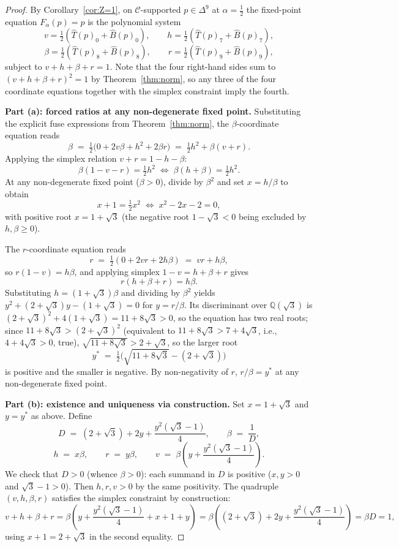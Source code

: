 \documentclass[11pt,reqno]{amsart}
\theoremstyle{plain}
\theoremstyle{definition}
\theoremstyle{remark}
\newcommand{\Q}{\mathbb{Q}}
\newcommand{\Cfour}{\mathcal{C}}
\newcommand{\Tfuse}{\widehat{T}}
\newcommand{\Bfuse}{\widehat{B}}
\newcommand{\Fmix}{F_{\alpha}}
\newcommand{\Simp}{\Delta^{9}}
\begin{document}
\begin{proof}
By Corollary~\ref{cor:Z=1}, on $\Cfour$-supported $p\in\Simp$ at
$\alpha=\tfrac12$ the fixed-point equation $\Fmix(p)=p$ is the
polynomial system
\[
v=\tfrac12(\Tfuse(p)_{0}+\Bfuse(p)_{0}),\qquad
h=\tfrac12(\Tfuse(p)_{7}+\Bfuse(p)_{7}),
\]
\[
\beta=\tfrac12(\Tfuse(p)_{8}+\Bfuse(p)_{8}),\qquad
r=\tfrac12(\Tfuse(p)_{9}+\Bfuse(p)_{9}),
\]
subject to $v+h+\beta+r=1$. Note that the four right-hand sides
sum to $(v+h+\beta+r)^{2}=1$ by Theorem~\ref{thm:norm}, so any
three of the four coordinate equations together with the simplex
constraint imply the fourth.

\textbf{Part (a): forced ratios at any non-degenerate fixed point.}
Substituting the explicit fuse expressions from
Theorem~\ref{thm:norm}, the $\beta$-coordinate equation reads
\[
\beta\;=\;\tfrac12\bigl(0+2v\beta+h^{2}+2\beta r\bigr)\;=\;\tfrac{1}{2}h^{2}+\beta(v+r).
\]
Applying the simplex relation $v+r=1-h-\beta$:
\[
\beta(1-v-r)=\tfrac{1}{2}h^{2}\;\Longleftrightarrow\;\beta(h+\beta)=\tfrac{1}{2}h^{2}.
\]
At any non-degenerate fixed point ($\beta>0$), divide by
$\beta^{2}$ and set $x=h/\beta$ to obtain
\[
x+1=\tfrac{1}{2}x^{2}\;\Longleftrightarrow\;x^{2}-2x-2=0,
\]
with positive root $x=1+\sqrt{3}$ (the negative root
$1-\sqrt{3}<0$ being excluded by $h,\beta\geq 0$).

The $r$-coordinate equation reads
\[
r\;=\;\tfrac12(0+2vr+2h\beta)\;=\;vr+h\beta,
\]
so $r(1-v)=h\beta$, and applying simplex $1-v=h+\beta+r$ gives
\begin{equation}\label{eq:R-non-degen}
r(h+\beta+r)=h\beta.
\end{equation}
Substituting $h=(1+\sqrt{3})\beta$ and dividing by $\beta^{2}$
yields $y^{2}+(2+\sqrt{3})y-(1+\sqrt{3})=0$ for $y=r/\beta$. Its
discriminant over $\Q(\sqrt{3})$ is $(2+\sqrt{3})^{2}+4(1+\sqrt{3})=11+8\sqrt{3}>0$,
so the equation has two real roots; since $11+8\sqrt{3}>(2+\sqrt{3})^{2}$
(equivalent to $11+8\sqrt{3}>7+4\sqrt{3}$, i.e., $4+4\sqrt{3}>0$,
true), $\sqrt{11+8\sqrt{3}}>2+\sqrt{3}$, so the larger root
\[
y^{*}\;=\;\tfrac{1}{2}\bigl(\sqrt{11+8\sqrt{3}}-(2+\sqrt{3})\bigr)
\]
is positive and the smaller is negative. By non-negativity of $r$,
$r/\beta=y^{*}$ at any non-degenerate fixed point.

\textbf{Part (b): existence and uniqueness via construction.}
Set $x=1+\sqrt{3}$ and $y=y^{*}$ as above. Define
\[
D\;=\;(2+\sqrt{3})+2y+\frac{y^{2}(\sqrt{3}-1)}{4},\qquad
\beta\;=\;\frac{1}{D},
\]
\[
h\;=\;x\beta,\qquad r\;=\;y\beta,\qquad v\;=\;\beta\!\left(y+\frac{y^{2}(\sqrt{3}-1)}{4}\right).
\]
We check that $D>0$ (whence $\beta>0$): each summand in $D$ is
positive ($x,y>0$ and $\sqrt{3}-1>0$). Then $h,r,v>0$ by the same
positivity. The quadruple $(v,h,\beta,r)$ satisfies the simplex
constraint by construction:
\[
v+h+\beta+r=\beta\!\left(y+\frac{y^{2}(\sqrt{3}-1)}{4}+x+1+y\right)=\beta\!\left((2+\sqrt{3})+2y+\frac{y^{2}(\sqrt{3}-1)}{4}\right)=\beta D=1,
\]
using $x+1=2+\sqrt{3}$ in the second equality.


\end{proof}
\end{document}
